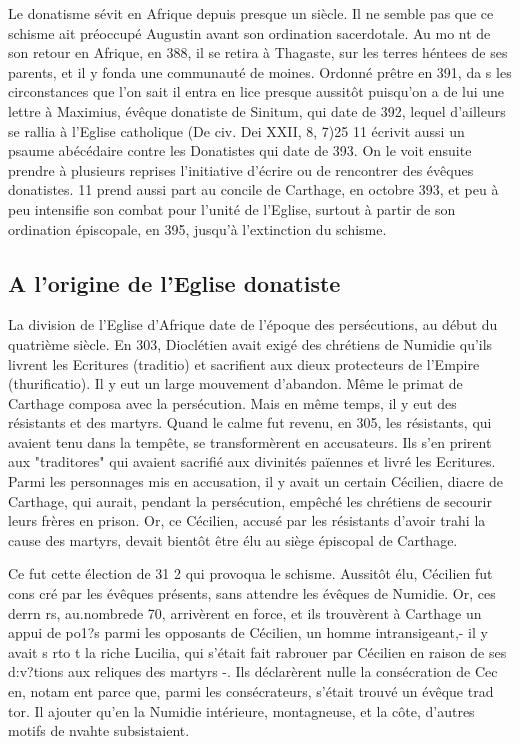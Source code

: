  
Le donatisme sévit en Afrique depuis presque un siècle. Il ne semble pas que ce schisme ait préoccupé Augustin avant son ordination sacerdotale. Au mo nt de son retour en Afrique, en 388, il se retira à Thagaste, sur les terres héntees de ses parents, et il y fonda une communauté de moines. Ordonné prêtre en 391, da s les circonstances que l'on sait il entra en lice presque aussitôt puisqu'on a de lui une lettre à Maximius, évêque donatiste de Sinitum, qui date de 392, lequel d'ailleurs se rallia à l'Eglise catholique (De civ. Dei XXII, 8, 7)25  11 écrivit aussi un psaume abécédaire contre les Donatistes qui date de 393. On le voit ensuite prendre à plusieurs reprises l'initiative d'écrire ou de rencontrer des évêques donatistes. 11 prend aussi part au concile de Carthage, en octobre 393, et peu à peu intensifie son combat pour l'unité de l'Eglise, surtout à partir de son ordination épiscopale, en 395, jusqu'à l'extinction du schisme.
\subsection{A  l'origine  de l'Eglise  donatiste}
 
La division de l'Eglise d'Afrique date de l'époque des persécutions, au début du quatrième siècle. En 303, Dioclétien avait exigé des chrétiens de Numidie qu'ils livrent les Ecritures (traditio) et sacrifient aux dieux protecteurs de l'Empire (thurificatio). Il y eut un large mouvement d'abandon. Même le primat de Carthage composa avec la persécution. Mais en même temps, il y eut des résistants et des martyrs. Quand le calme fut revenu, en 305, les résistants, qui avaient tenu dans la tempête, se transformèrent en accusateurs. Ils s'en prirent aux "traditores" qui avaient sacrifié aux divinités païennes et livré les Ecritures. Parmi les personnages mis en accusation, il y avait un certain Cécilien, diacre de Carthage, qui aurait, pendant la persécution, empêché les chrétiens de secourir leurs frères en prison. Or, ce Cécilien, accusé par les résistants d'avoir trahi la cause des martyrs, devait bientôt être élu au siège épiscopal de Carthage.

Ce fut cette élection de 31 2 qui provoqua le schisme.	Aussitôt élu, Cécilien fut cons cré par les évêques présents, sans attendre les évêques	de Numidie. Or, ces derrn rs, au.nombrede 70, arrivèrent en force,	et ils		trouvèrent à Carthage un appui de po1?s parmi les opposants de Cécilien, un homme intransigeant,- il y avait s rto t la riche Lucilia, qui s'était fait rabrouer par Cécilien en raison de ses d:v?tions aux reliques des martyrs -. Ils déclarèrent	nulle la consécration	de Cec   en, notam ent parce que, parmi les consécrateurs, s'était trouvé un évêque
trad tor. Il ajouter qu'en la Numidie intérieure, montagneuse, et la côte, d'autres motifs de nvahte subsistaient.


